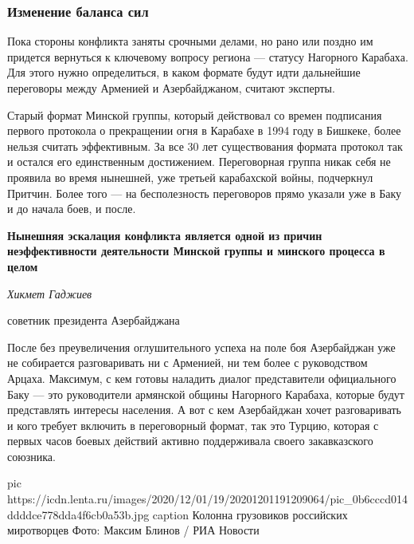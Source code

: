  
 
 
 
 

\subsubsection{Изменение баланса сил}

Пока стороны конфликта заняты срочными делами, но рано или поздно им придется
вернуться к ключевому вопросу региона — статусу Нагорного Карабаха. Для этого
нужно определиться, в каком формате будут идти дальнейшие переговоры между
Арменией и Азербайджаном, считают эксперты.

Старый формат Минской группы, который действовал со времен подписания первого
протокола о прекращении огня в Карабахе в 1994 году в Бишкеке, более нельзя
считать эффективным. За все 30 лет существования формата протокол так и остался
его единственным достижением. Переговорная группа никак себя не проявила во
время нынешней, уже третьей карабахской войны, подчеркнул Притчин. Более того —
на бесполезность переговоров прямо указали уже в Баку и до начала боев, и
после.

\begin{leftbar}
	\bfseries
Нынешняя эскалация конфликта является одной из причин неэффективности
деятельности Минской группы и минского процесса в целом\par
\em
		Хикмет Гаджиев\par 
		советник президента Азербайджана\par
\end{leftbar}

После без преувеличения оглушительного успеха на поле боя Азербайджан уже не
собирается разговаривать ни с Арменией, ни тем более с руководством Арцаха.
Максимум, с кем готовы наладить диалог представители официального Баку — это
руководители армянской общины Нагорного Карабаха, которые будут представлять
интересы населения. А вот с кем Азербайджан хочет разговаривать и кого требует
включить в переговорный формат, так это Турцию, которая с первых часов боевых
действий активно поддерживала своего закавказского союзника.

\ifcmt
pic https://icdn.lenta.ru/images/2020/12/01/19/20201201191209064/pic_0b6cccd014ddddce778dda4f6cb0a53b.jpg
caption Колонна грузовиков российских миротворцев Фото: Максим Блинов / РИА Новости
\fi

